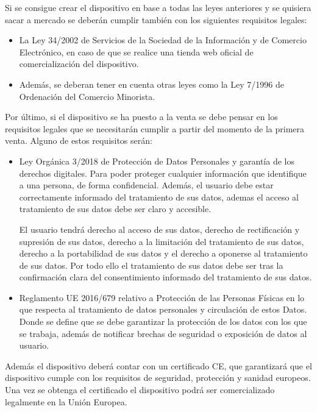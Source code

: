 Si se consigue crear el dispositivo en base a todas las leyes anteriores y se quisiera sacar a mercado se deberán cumplir también con los siguientes requisitos legales:
\begin{itemize}
    \item La Ley 34/2002\cite{comercioElectronico} de Servicios de la Sociedad de la Información y de Comercio Electrónico, en caso de que se realice una tienda web oficial de comercialización del dispositivo.
    
    \item Además, se deberan tener en cuenta otras leyes\cite{comercio} como la Ley 7/1996\cite{comercioMinorista} de Ordenación del Comercio Minorista.
\end{itemize}

Por último, si el dispositivo se ha puesto a la venta se debe pensar en los requisitos legales que se necesitarán cumplir a partir del momento de la primera venta. Alguno de estos requisitos serán:
\begin{itemize}
    \item Ley Orgánica 3/2018\cite{protDatos} de Protección de Datos Personales y garantía de los derechos digitales. Para poder proteger cualquier información que identifique a una persona, de forma confidencial. Además, el usuario debe estar correctamente informado del tratamiento de sus datos, ademas el acceso al tratamiento de sus datos debe ser claro y accesible.

    El usuario tendrá derecho al acceso de sus datos, derecho de rectificación y supresión de sus datos, derecho a la limitación del tratamiento de sus datos, derecho a la portabilidad de sus datos y el derecho a oponerse al tratamiento de sus datos. Por todo ello el tratamiento de sus datos debe ser tras la confirmación clara del consentimiento informado del tratamiento de sus datos.

    \item Reglamento UE 2016/679\cite{protDatosEU} relativo a Protección de las Personas Físicas en lo que respecta al tratamiento de datos personales y circulación de estos Datos. Donde se define que se debe garantizar la protección de los datos con los que se trabaja, además de notificar brechas de seguridad o exposición de datos al usuario.
\end{itemize}


Además el dispositivo deberá contar con un certificado CE\cite{certificadoEuropeo}, que garantizará que el dispositivo cumple con los requisitos de seguridad, protección y sanidad europeos. Una vez se obtenga el certificado el dispositivo podrá ser comercializado legalmente en la Unión Europea.
